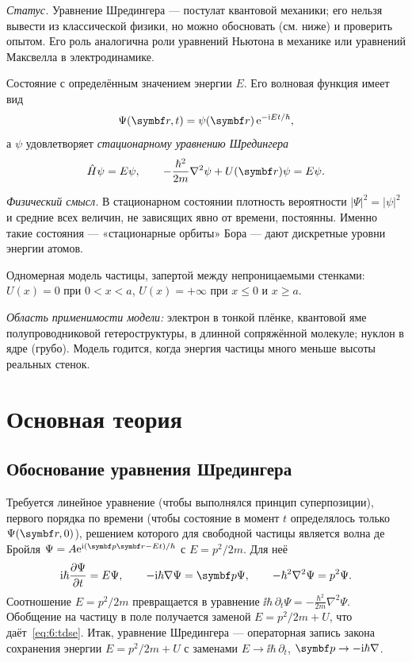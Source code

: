\emph{Статус.} Уравнение Шредингера — постулат квантовой механики; его нельзя вывести из
классической физики, но можно обосновать (см. ниже) и проверить опытом. Его роль аналогична
роли уравнений Ньютона в механике или уравнений Максвелла в электродинамике.

\begin{definition}
Состояние с определённым значением энергии $E$. Его волновая функция имеет вид
\begin{equation}\label{eq:6:stat}
  \Psi(\vect r,t)=\psi(\vect r)\,\ee^{-\ii Et/\hbar},
\end{equation}
а $\psi$ удовлетворяет \emph{стационарному уравнению Шредингера}
\begin{equation}\label{eq:6:sse}
  \op H\psi=E\psi,\qquad -\frac{\hbar^2}{2m}\nabla^2\psi+U(\vect r)\psi=E\psi .
\end{equation}
\end{definition}

\emph{Физический смысл.} В стационарном состоянии плотность вероятности $|\Psi|^2=|\psi|^2$ и
средние всех величин, не зависящих явно от времени, постоянны. Именно такие состояния —
«стационарные орбиты» Бора — дают дискретные уровни энергии атомов.

\begin{definition}
Одномерная модель частицы, запертой между непроницаемыми стенками:
$U(x)=0$ при $0<x<a$, $U(x)=+\infty$ при $x\le0$ и $x\ge a$.
\end{definition}

\emph{Область применимости модели:} электрон в тонкой плёнке, квантовой яме полупроводниковой
гетероструктуры, в длинной сопряжённой молекуле; нуклон в ядре (грубо). Модель годится,
когда энергия частицы много меньше высоты реальных стенок.

\section{Основная теория}

\subsection{Обоснование уравнения Шредингера}

Требуется линейное уравнение (чтобы выполнялся принцип суперпозиции), первого порядка по
времени (чтобы состояние в момент $t$ определялось только $\Psi(\vect r,0)$), решением которого
для свободной частицы является волна де Бройля $\Psi=A\ee^{\ii(\vect p\vect r-Et)/\hbar}$ с
$E=p^2/2m$. Для неё
\[
  \ii\hbar\pdiff{\Psi}{t}=E\Psi,\qquad -\ii\hbar\nabla\Psi=\vect p\Psi,\qquad
  -\hbar^2\nabla^2\Psi=p^2\Psi .
\]
Соотношение $E=p^2/2m$ превращается в уравнение $\ii\hbar\,\partial_t\Psi=-\frac{\hbar^2}{2m}\nabla^2\Psi$.
Обобщение на частицу в поле получается заменой $E=p^2/2m+U$, что даёт~\eqref{eq:6:tdse}.
Итак, уравнение Шредингера — операторная запись закона сохранения энергии
$E=p^2/2m+U$ с заменами $E\to\ii\hbar\,\partial_t$, $\vect p\to-\ii\hbar\nabla$.

